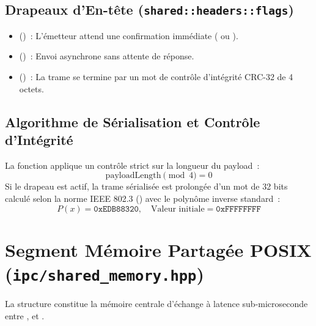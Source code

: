 \subsection{Drapeaux d'En-tête (\texttt{shared::headers::flags})}
\begin{itemize}
    \item {} ()~: L'émetteur attend une confirmation immédiate ( ou ).
    \item {} ()~: Envoi asynchrone sans attente de réponse.
    \item {} ()~: La trame se termine par un mot de contrôle d'intégrité CRC-32 de 4 octets.
\end{itemize}

\subsection{Algorithme de Sérialisation et Contrôle d'Intégrité}
La fonction  applique un contrôle strict sur la longueur du payload~:
\begin{equation}
    \text{payloadLength} \pmod 4 = 0
\end{equation}
Si le drapeau  est actif, la trame sérialisée est prolongée d'un mot de 32 bits calculé selon la norme IEEE 802.3 () avec le polynôme inverse standard~:
\begin{equation}
    P(x) = \texttt{0xEDB88320}, \quad \text{Valeur initiale} = \texttt{0xFFFFFFFF}
\end{equation}

\section{Segment Mémoire Partagée POSIX (\texttt{ipc/shared\_memory.hpp})}
La structure  constitue la mémoire centrale d'échange à latence sub-microseconde entre ,  et .

